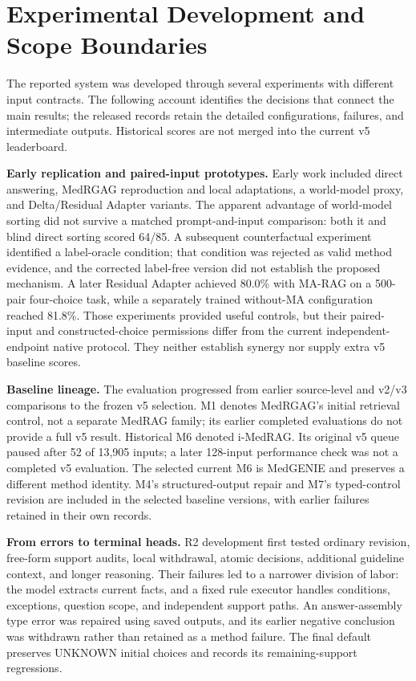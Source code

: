 \section{Experimental Development and Scope Boundaries}
\label{sec:appendix_development}

The reported system was developed through several experiments with different input
contracts. The following account identifies the decisions that connect the main results;
the released records retain the detailed configurations, failures, and intermediate
outputs. Historical scores are not merged into the current v5 leaderboard.

\textbf{Early replication and paired-input prototypes.} Early work included direct
answering, MedRGAG reproduction and local adaptations, a world-model proxy, and
Delta/Residual Adapter variants. The apparent advantage of world-model sorting did not
survive a matched prompt-and-input comparison: both it and blind direct sorting scored
64/85. A subsequent counterfactual experiment identified a label-oracle condition;
that condition was rejected as valid method evidence, and the corrected label-free
version did not establish the proposed mechanism. A later Residual Adapter achieved
80.0\% with MA-RAG on a 500-pair four-choice task, while a separately trained
without-MA configuration reached 81.8\%. Those experiments provided useful controls,
but their paired-input and constructed-choice permissions differ from the current
independent-endpoint native protocol. They neither establish synergy nor supply extra
v5 baseline scores.

\textbf{Baseline lineage.} The evaluation progressed from earlier source-level and
v2/v3 comparisons to the frozen v5 selection. M1 denotes MedRGAG's initial retrieval
control, not a separate MedRAG family; its earlier completed evaluations do not provide
a full v5 result. Historical M6 denoted i-MedRAG. Its original v5 queue paused after
52 of 13,905 inputs; a later 128-input performance check was not a completed v5
evaluation. The selected current M6 is MedGENIE and preserves a different method
identity. M4's structured-output repair and M7's typed-control revision are included
in the selected baseline versions, with earlier failures retained in their own records.

\textbf{From errors to terminal heads.} R2 development first tested ordinary revision,
free-form support audits, local withdrawal, atomic decisions, additional guideline
context, and longer reasoning. Their failures led to a narrower division of labor:
the model extracts current facts, and a fixed rule executor handles conditions,
exceptions, question scope, and independent support paths. An answer-assembly type
error was repaired using saved outputs, and its earlier negative conclusion was
withdrawn rather than retained as a method failure. The final default preserves
UNKNOWN initial choices and records its remaining-support regressions.


